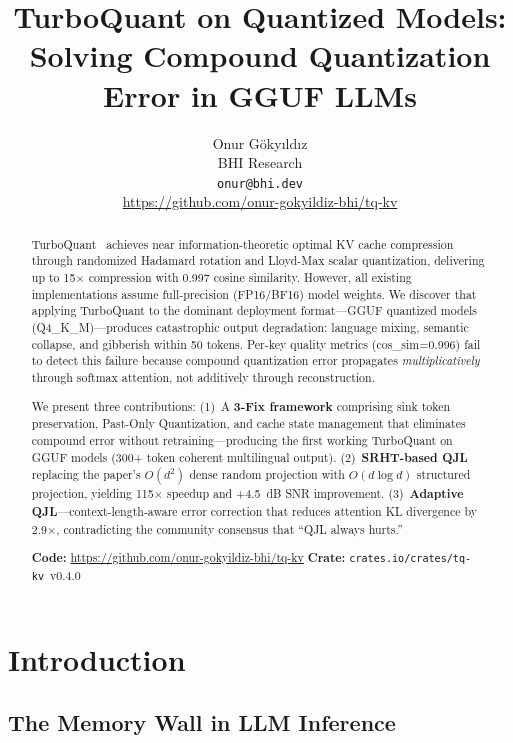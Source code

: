 \documentclass[11pt]{article}
\title{TurboQuant on Quantized Models:\\Solving Compound Quantization Error in GGUF LLMs}
\author{
  Onur G\"oky{\i}ld{\i}z \\
  BHI Research \\
  \texttt{onur@bhi.dev} \\
  \url{https://github.com/onur-gokyildiz-bhi/tq-kv}
}
\begin{document}
\maketitle

\begin{abstract}
TurboQuant~\citep{zandieh2026turboquant} achieves near information-theoretic optimal KV cache compression through randomized Hadamard rotation and Lloyd-Max scalar quantization, delivering up to 15$\times$ compression with 0.997 cosine similarity. However, all existing implementations assume full-precision (FP16/BF16) model weights. We discover that applying TurboQuant to the dominant deployment format---GGUF quantized models (Q4\_K\_M)---produces catastrophic output degradation: language mixing, semantic collapse, and gibberish within 50 tokens. Per-key quality metrics (cos\_sim=0.996) fail to detect this failure because compound quantization error propagates \emph{multiplicatively} through softmax attention, not additively through reconstruction.

We present three contributions: (1)~A \textbf{3-Fix framework} comprising sink token preservation, Past-Only Quantization, and cache state management that eliminates compound error without retraining---producing the first working TurboQuant on GGUF models (300+ token coherent multilingual output). (2)~\textbf{SRHT-based QJL} replacing the paper's $O(d^2)$ dense random projection with $O(d \log d)$ structured projection, yielding 115$\times$ speedup and +4.5~dB SNR improvement. (3)~\textbf{Adaptive QJL}---context-length-aware error correction that reduces attention KL divergence by 2.9$\times$, contradicting the community consensus that ``QJL always hurts.''

\noindent\textbf{Code:} \url{https://github.com/onur-gokyildiz-bhi/tq-kv} \quad \textbf{Crate:} \texttt{crates.io/crates/tq-kv}~v0.4.0
\end{abstract}

\section{Introduction}

\subsection{The Memory Wall in LLM Inference}
\end{document}
